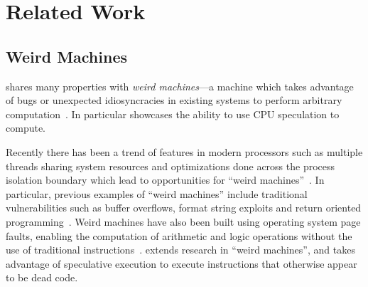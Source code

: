 \section{Related Work}
\label{sec:related-work}


\subsection{Weird Machines}

\speculake shares many properties with \textit{weird machines}---a machine which
takes advantage of bugs or unexpected idiosyncracies in existing systems to
perform arbitrary
computation~\cite{weird_machines,bratus2011exploit}. In
particular \speculake showcases the ability to use CPU speculation to compute.

Recently there has been a trend of features in modern processors such as
multiple threads sharing system resources and optimizations done across the
process isolation boundary which lead to opportunities for ``weird
machines''~\cite{d2015exploiting}. In particular, previous examples of ``weird
machines'' include traditional vulnerabilities such as buffer overflows, format
string exploits and return oriented programming~\cite{buffer_overflow,
format_string_exploit, shacham2007geometry}. Weird machines have also been built
using operating system page faults, enabling the computation of arithmetic and
logic operations without the use of traditional
instructions~\cite{bangert2013page}.
\speculake extends research in ``weird machines'', and takes advantage of
speculative execution to execute instructions that otherwise appear to be dead
code.





